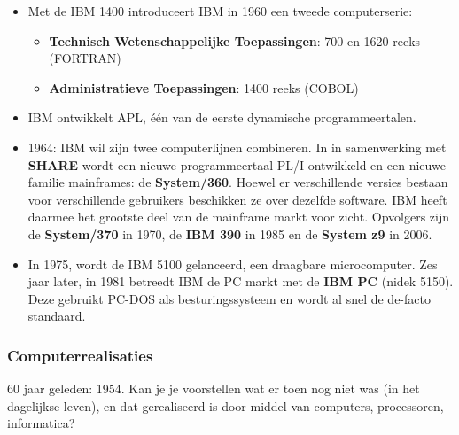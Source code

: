 \documentclass[../main.tex]{subfiles}
\begin{document}
\begin{solution}
\begin{itemize}
	\item Met de IBM 1400 introduceert IBM in 1960 een tweede computerserie:
	\begin{itemize}
		\item \textbf{Technisch Wetenschappelijke Toepassingen}: 700 en 1620 reeks (FORTRAN)
		\item \textbf{Administratieve Toepassingen}: 1400 reeks (COBOL)
	\end{itemize}
	\item IBM ontwikkelt APL, \'e\'en van de eerste dynamische programmeertalen.
	\item 1964: IBM wil zijn twee computerlijnen combineren. In in samenwerking met \textbf{SHARE} wordt een nieuwe programmeertaal PL/I ontwikkeld en een nieuwe familie mainframes: de \textbf{System/360}. Hoewel er verschillende versies bestaan voor verschillende gebruikers beschikken ze over dezelfde software. IBM heeft daarmee het grootste deel van de mainframe markt voor zicht. Opvolgers zijn de \textbf{System/370} in 1970, de \textbf{IBM 390} in 1985 en de \textbf{System z9} in 2006.
	\item In 1975, wordt de IBM 5100 gelanceerd, een draagbare microcomputer. Zes jaar later, in 1981 betreedt IBM de PC markt met de \textbf{IBM PC} (nidek 5150). Deze gebruikt PC-DOS als besturingssysteem en wordt al snel de de-facto standaard.
\end{itemize}
\end{solution}

\subsubsection{Computerrealisaties}
\begin{question}
60 jaar geleden: 1954. Kan je je voorstellen wat er toen nog niet was (in het dagelijkse leven), en dat gerealiseerd is door middel van computers, processoren, informatica?
\end{question}
\end{document}
